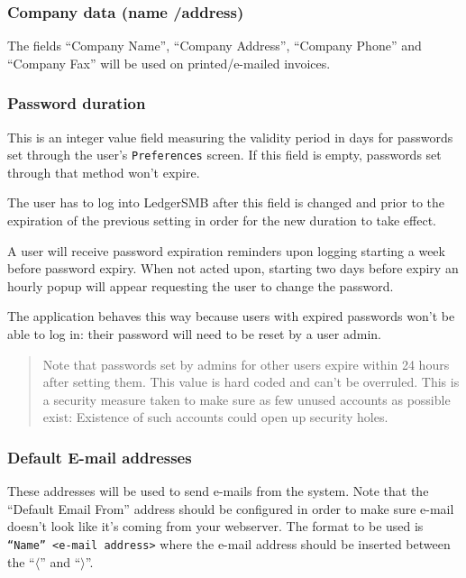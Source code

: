\subsubsection{Company data (name /address)}
\label{subsubsec-company-config-defaults-name-address}

The fields ``Company Name'', ``Company Address'',
``Company Phone'' and ``Company Fax'' will be used on printed/e-mailed invoices.

\subsubsection{Password duration}
\label{subsubsec-company-config-defaults-password-duration}

This is an integer value field measuring the validity period in days for passwords set through
the user's \texttt{Preferences} screen. If this field is empty, passwords set through that method
won't expire.

The user has to log into LedgerSMB after this field is changed and prior to the expiration of the previous setting in order for the new duration to take effect.

A user will receive password  expiration reminders upon logging starting a week before password
expiry. When not acted upon, starting two days before expiry an hourly popup will appear
requesting the user to change the password.

The application behaves this way because users with expired passwords won't be able to log in:
their password will need to be reset by a user admin.

\begin{quote}
Note that passwords set by admins for other users expire  within 24 hours after setting them.
This value is hard coded and can't be overruled. This is a security measure taken to make
sure as few unused accounts as possible exist: Existence of such accounts could open up security
holes.
\end{quote}


\subsubsection{Default E-mail addresses}
\label{subsubsec-company-config-defaults-email}

These addresses will be used to send e-mails  from the system.
Note that the ``Default Email From'' address should be configured in order to make sure
e-mail doesn't look like it's coming from your webserver. The format to be used is \texttt{``Name'' <e-mail address>} where the e-mail address should be inserted between the
``$\langle$'' and ``$\rangle$''.

